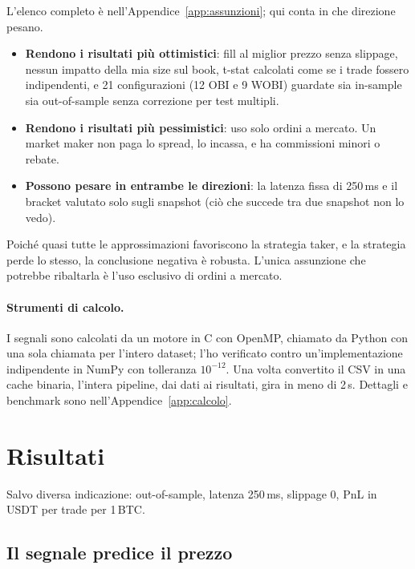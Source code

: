 \documentclass[a4paper,11pt]{article}
\begin{document}
L'elenco completo è nell'Appendice~\ref{app:assunzioni}; qui conta in che direzione pesano.
\begin{itemize}[leftmargin=*]
  \item \textbf{Rendono i risultati più ottimistici}: fill al miglior prezzo senza slippage,
        nessun impatto della mia size sul book, t-stat calcolati come se i trade fossero
        indipendenti, e 21 configurazioni (12 OBI e 9 WOBI) guardate sia in-sample sia
        out-of-sample senza correzione per test multipli.
  \item \textbf{Rendono i risultati più pessimistici}: uso solo ordini a mercato. Un market
        maker non paga lo spread, lo incassa, e ha commissioni minori o rebate.
  \item \textbf{Possono pesare in entrambe le direzioni}: la latenza fissa di 250\,ms e il
        bracket valutato solo sugli snapshot (ciò che succede tra due snapshot non lo vedo).
\end{itemize}
Poiché quasi tutte le approssimazioni favoriscono la strategia taker, e la strategia perde lo
stesso, la conclusione negativa è robusta. L'unica assunzione che potrebbe ribaltarla è l'uso
esclusivo di ordini a mercato.

\paragraph{Strumenti di calcolo.} I segnali sono calcolati da un motore in C con OpenMP,
chiamato da Python con una sola chiamata per l'intero dataset; l'ho verificato contro
un'implementazione indipendente in NumPy con tolleranza $10^{-12}$. Una volta convertito il CSV
in una cache binaria, l'intera pipeline, dai dati ai risultati, gira in meno di 2\,s. Dettagli e benchmark sono nell'Appendice~\ref{app:calcolo}.

\section{Risultati}
\label{sec:risultati}

Salvo diversa indicazione: out-of-sample, latenza 250\,ms, slippage 0, PnL in USDT per trade
per 1\,BTC.

\subsection{Il segnale predice il prezzo}
\label{sec:ris-predice}
\end{document}
